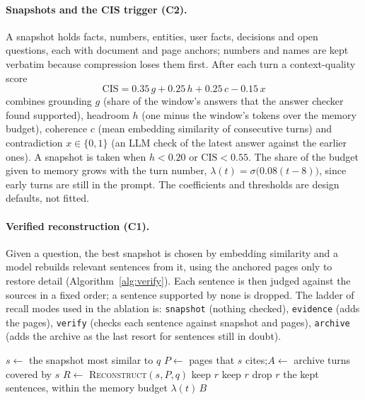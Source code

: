 \documentclass[10pt,twocolumn]{article}
\begin{document}
\paragraph{Snapshots and the CIS trigger (C2).}
A snapshot holds facts, numbers, entities, user facts, decisions and open questions, each with document and page anchors; numbers and names are kept verbatim because compression loses them first. After each turn a context-quality score
\[
\mathrm{CIS}=0.35\,g+0.25\,h+0.25\,c-0.15\,x
\]
combines grounding $g$ (share of the window's answers that the answer checker found supported), headroom $h$ (one minus the window's tokens over the memory budget), coherence $c$ (mean embedding similarity of consecutive turns) and contradiction $x\in\{0,1\}$ (an LLM check of the latest answer against the earlier ones). A snapshot is taken when $h<0.20$ or $\mathrm{CIS}<0.55$. The share of the budget given to memory grows with the turn number, $\lambda(t)=\sigma\bigl(0.08(t-8)\bigr)$, since early turns are still in the prompt. The coefficients and thresholds are design defaults, not fitted.

\paragraph{Verified reconstruction (C1).}
Given a question, the best snapshot is chosen by embedding similarity and a model rebuilds relevant sentences from it, using the anchored pages only to restore detail (Algorithm~\ref{alg:verify}). Each sentence is then judged against the sources in a fixed order; a sentence supported by none is dropped. The ladder of recall modes used in the ablation is: \texttt{snapshot} (nothing checked), \texttt{evidence} (adds the pages), \texttt{verify} (checks each sentence against snapshot and pages), \texttt{archive} (adds the archive as the last resort for sentences still in doubt).

\begin{algorithm}[t]
\caption{Verified reconstruction of memory for a question $q$}\label{alg:verify}
\begin{algorithmic}[1]
\State $s \gets$ the snapshot most similar to $q$
\State $P \gets$ pages that $s$ cites;\quad $A \gets$ archive turns covered by $s$
\State $R \gets$ \textsc{Reconstruct}$(s, P, q)$ 
   keep $r$
   keep $r$
  \Else{} drop $r$
  \EndIf
\EndFor
\State \Return the kept sentences, within the memory budget $\lambda(t)\,B$
\end{algorithmic}
\end{algorithm}
\end{document}
